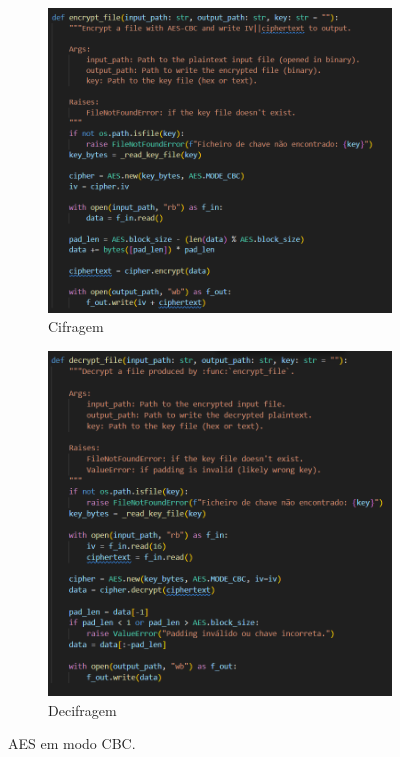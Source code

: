 \documentclass[a4paper]{article}
\begin{document}
\begin{figure}[H]
	\centering
	\begin{subfigure}[b]{0.48\textwidth}
		\centering
		\includegraphics[width=\textwidth]{Recursos/aes_enc.png}
		\caption{Cifragem}
		\label{fig:aes_enc}
	\end{subfigure}
	\hfill
	\begin{subfigure}[b]{0.48\textwidth}
		\centering
		\includegraphics[width=\textwidth]{Recursos/aes_dec.png}
		\caption{Decifragem}
		\label{fig:aes_dec}
	\end{subfigure}
	\caption{AES em modo CBC.}
	\label{fig:aes_combined}
\end{figure}
\end{document}
